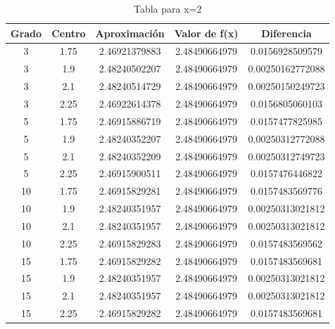 \documentclass[a4paper,12pt]{report}
\begin{document}
\begin{table}[htb]
\begin{center}
  \caption{Tabla para x=2}
  \begin{tabular}{|c|c|c|c|c|} %
  \hline
         Grado  &  Centro  &  Aproximación    &  Valor de f(x)  &  Diferencia        \\ \hline
            3   &   1.75   &  2.46921379883   &  2.48490664979  &  0.0156928509579   \\ \hline
            3   &   1.9    &  2.48240502207   &  2.48490664979  &  0.00250162772088  \\ \hline
            3   &   2.1    &  2.48240514729   &  2.48490664979  &  0.00250150249723  \\ \hline
            3   &   2.25   &  2.46922614378   &  2.48490664979  &  0.0156805060103   \\ \hline
            5   &   1.75   &  2.46915886719   &  2.48490664979  &  0.0157477825985   \\ \hline
            5   &   1.9    &  2.48240352207   &  2.48490664979  &  0.00250312772088  \\ \hline
            5   &   2.1    &  2.48240352209   &  2.48490664979  &  0.00250312749723  \\ \hline
            5   &   2.25   &  2.46915900511   &  2.48490664979  &  0.0157476446822   \\ \hline
            10  &   1.75   &  2.46915829281   &  2.48490664979  &  0.0157483569776   \\ \hline
            10  &   1.9    &  2.48240351957   &  2.48490664979  &  0.00250313021812  \\ \hline
            10  &   2.1    &  2.48240351957   &  2.48490664979  &  0.00250313021812  \\ \hline
            10  &   2.25   &  2.46915829283   &  2.48490664979  &  0.0157483569562   \\ \hline
            15  &   1.75   &  2.46915829282   &  2.48490664979  &  0.0157483569681   \\ \hline
            15  &   1.9    &  2.48240351957   &  2.48490664979  &  0.00250313021812  \\ \hline
            15  &   2.1    &  2.48240351957   &  2.48490664979  &  0.00250313021812  \\ \hline
            15  &   2.25   &  2.46915829282   &  2.48490664979  &  0.0157483569681   \\ \hline
   \end{tabular}
   \label{Tabla}
   \end{center}
\end{table}
\end{document}
